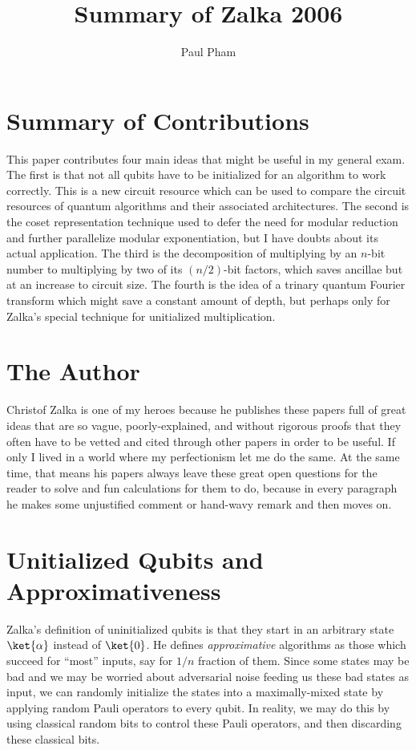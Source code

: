 \documentclass{article}
\title{Summary of Zalka 2006 \cite{Zalka2006a}}
\author{Paul Pham}
\begin{document}
\maketitle

\section{Summary of Contributions}

This paper contributes four main ideas that might be useful in my general
exam. The first is that not all qubits have to be initialized for an algorithm
to work correctly. This is a new circuit resource which can be used to
compare the circuit resources of quantum algorithms and their associated
architectures. The second is the coset representation technique used to defer
the need for modular reduction and further parallelize modular exponentiation,
but I have doubts about its actual application.
The third is the decomposition of multiplying by an $n$-bit number to
multiplying by two of its $(n/2)$-bit factors, which saves ancillae but
at an increase to circuit size. The fourth is the idea of a trinary
quantum Fourier transform which might save a constant amount of depth, but
perhaps only for Zalka's special technique for unitialized multiplication.

\section{The Author}

Christof Zalka is one of my heroes because he publishes these papers full of
great ideas that are so vague, poorly-explained, and without rigorous proofs
that they often have to be
vetted and cited through other papers in order to be useful. If only I lived
in a world where my perfectionism let me do the same. At the same time, that
means his papers always leave these great open questions for the reader to
solve and fun calculations for them to do, because in every paragraph he
makes some unjustified comment or hand-wavy remark and then moves on.

\section{Unitialized Qubits and Approximativeness}

Zalka's definition of uninitialized qubits is that they start in an
arbitrary state $\ket{\alpha}$ instead of $\ket{0}$. He defines
\emph{approximative} algorithms as those which succeed for ``most'' inputs,
say for $1/n$ fraction of them. Since some states may be bad and we may be
worried about adversarial noise feeding us these bad states as input, we can
randomly initialize the states into a maximally-mixed state by applying
random Pauli operators to every qubit. In reality, we may do this by
using classical random bits to control these Pauli operators, and then discarding
these classical bits.
\end{document}
